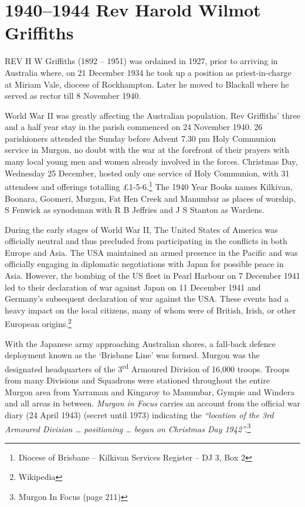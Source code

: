 \printendnotes[custom]
\setcounter{endnote}{0}




\chapter{1940--1944 Rev Harold Wilmot Griffiths}
\nobalance


\lettrine[lines=3]{R}{EV}
 H W Griffiths (1892 -- 1951) was ordained in 1927, prior to arriving in Australia where, on 21 December 1934 he took up a position as priest-in-charge at Miriam Vale, diocese of Rockhampton. Later he moved to Blackall where he served as rector till 8 November 1940.

World War II was greatly affecting the Australian population. Rev Griffiths' three and a half year stay in the parish commenced on 24 November 1940. 26 parishioners attended the Sunday before Advent 7.30 pm Holy Communion service in Murgon, no doubt with the war at the forefront of their prayers with many local young men and women already involved in the forces. Christmas Day, Wednesday 25 December, hosted only one service of Holy Communion, with 31 attendees and offerings totalling \pounds1-5-6.\footnote{Diocese of Brisbane -- Kilkivan Services Register -- DJ 3, Box 2} The 1940 Year Books names Kilkivan, Boonara, Goomeri, Murgon, Fat Hen Creek and Manumbar as places of worship, S Fenwick as synodsman with R B Jeffries and J S Stanton as Wardens.


During the early stages of World War II, The United States of America was officially neutral and thus precluded from participating in the conflicts in both Europe and Asia. The USA maintained an armed presence in the Pacific and was officially engaging in diplomatic negotiations with Japan for possible peace in Asia. However, the bombing of the US fleet in Pearl Harbour on 7 December 1941 led to their declaration of war against Japan on 11 December 1941 and Germany's subsequent declaration of war against the USA. These events had a heavy impact on the local citizens, many of whom were of British, Irish, or other European origins.\footnote{Wikipedia}


With the Japanese army approaching Australian shores, a fall-back defence deployment known as the `Brisbane Line' was formed. Murgon was the designated headquarters of the 3\textsuperscript{rd} Armoured Division of 16,000 troops. Troops from many Divisions and Squadrons were stationed throughout the entire Murgon area from Yarraman and Kingaroy to Manumbar, Gympie and Windera and all areas in between. \emph{Murgon in Focus} carries an account from the official war diary (24 April 1943) (secret until 1973) indicating the \emph{``location of the 3rd Armoured Division \ldots{} positioning \ldots{} began on Christmas Day 1942''.}\footnote{Murgon In Focus (page 211)}


